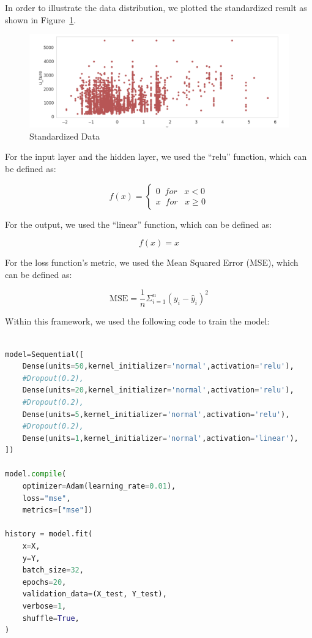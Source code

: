 \documentclass{scrartcl}
\begin{document}
\newpage

\noindent In order to illustrate the data distribution, we plotted the standardized result as shown in Figure~\ref{fig:NN4}. 

\begin{figure}[H]
	\begin{center}
		\includegraphics[scale=1.0]{Graphics/Neural Network Images/NN4.png}
	\end{center}
	\caption{Standardized Data}
	\label{fig:NN4}
\end{figure}


\noindent For the input layer and the hidden layer, we used the “relu” function, which can be defined as:

\[f(x) = \left\{\begin{matrix}
0 \;\;for \;\;\;x<0\\ 
x \;\;for \;\;\;x\geqslant 0
\end{matrix}\right.\]

\noindent For the output, we used the “linear” function, which can be defined as: 

\[f(x) = x\]

\noindent For the loss function’s metric, we used the Mean Squared Error (MSE), which can be defined as:

\[\mathrm{MSE}=\frac{1}{n} \Sigma_{i=1}^n\left(y_i-\hat{y}_i\right)^2\]

\noindent Within this framework, we used the following code to train the model:

\begin{lstlisting}[language=Python, caption= Code for training overall data, basicstyle=\tiny,captionpos=b]

model=Sequential([
    Dense(units=50,kernel_initializer='normal',activation='relu'),
    #Dropout(0.2),
    Dense(units=20,kernel_initializer='normal',activation='relu'),
    #Dropout(0.2),
    Dense(units=5,kernel_initializer='normal',activation='relu'),
    #Dropout(0.2),
    Dense(units=1,kernel_initializer='normal',activation='linear'),
])

model.compile(
    optimizer=Adam(learning_rate=0.01),
    loss="mse",
    metrics=["mse"])

history = model.fit(
    x=X,
    y=Y,
    batch_size=32,
    epochs=20,
    validation_data=(X_test, Y_test),
    verbose=1,
    shuffle=True,
)

\end{lstlisting}
\end{document}

